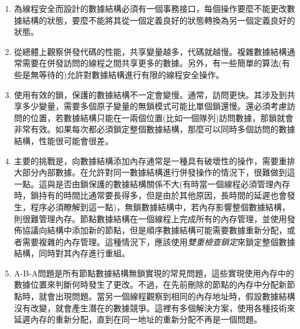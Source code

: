 \begin{enumerate}
\item 
為線程安全而設計的數據結構必須有一個事務接口，每個操作要麼不能更改數據結構的狀態，要麼不能將其從一個定義良好的狀態轉換為另一個定義良好的狀態。

\item 
從總體上觀察併發代碼的性能，共享變量越多，代碼就越慢。複雜數據結構通常需要在併發訪問的線程之間共享更多的數據。另外，有一些簡單的算法(有些是無等待的)允許對數據結構進行有限的線程安全操作。

\item 
使用有效的鎖，保護的數據結構不一定會變慢。通常，訪問更快。其涉及到共享多少變量，需要多個原子變量的無鎖模式可能比單個鎖還慢。還必須考慮訪問的位置，若數據結構只能在一兩個位置(比如一個隊列)訪問數據，那鎖就會非常有效。如果每次都必須鎖定整個數據結構，那麼可以同時多個訪問的數據結構，性能很可能會很差。

\item
主要的挑戰是，向數據結構添加內存通常是一種具有破壞性的操作，需要重排大部分內部數據。在允許對同一數據結構進行併發操作的情況下，很難做到這一點。這與是否由鎖保護的數據結構關係不大(有時當一個線程必須管理內存時，鎖持有的時間比通常要長得多，但是由於其他原因，長時間的延遲也會發生，程序必須瞭解到這一點)，無鎖數據結構中，若內存影響整個數據結構，則很難管理內存。節點數據結構在一個線程上完成所有的內存管理，並使用發佈協議向結構中添加新的節點，但是順序數據結構可能需要數據重新分配，或者需要複雜的內存管理。這種情況下，應該使用\textit{雙重檢查鎖定}來鎖定整個數據結構，同時對其內存進行重組。

\item
A-B-A問題是所有節點數據結構無鎖實現的常見問題，這些實現使用內存中的數據位置來判斷何時發生了更改。不過，在先前刪除的節點的內存中分配新節點時，就會出現問題。當另一個線程觀察到相同的內存地址時，假設數據結構沒有改變，就會產生潛在的數據競爭。這裡有多個解決方案，使用各種技術來延遲內存的重新分配，直到在同一地址的重新分配不再是一個問題。

\end{enumerate}